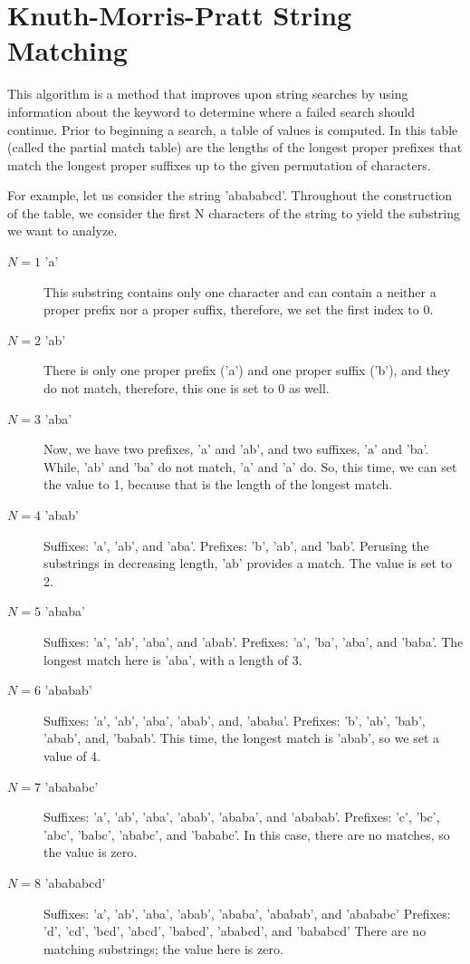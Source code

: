 \section{Knuth-Morris-Pratt String Matching}
This algorithm is a method that improves upon string searches by using information about the keyword to determine where a failed search should continue.
Prior to beginning a search, a table of values is computed.
In this table (called the partial match table) are the lengths of the longest proper prefixes that match the longest proper suffixes up to the given permutation of characters.

For example, let us consider the string 'abababcd'.
Throughout the construction of the table, we consider the first N characters of the string to yield the substring we want to analyze.

\begin{description}
\item[$N = 1$ 'a']
This substring contains only one character and can contain a neither a proper prefix nor a proper suffix, therefore, we set the first index to 0.

\item[$N = 2$ 'ab']
There is only one proper prefix ('a') and one proper suffix ('b'), and they do not match, therefore, this one is set to 0 as well.

\item[$N = 3$ 'aba']
Now, we have two prefixes, 'a' and 'ab', and two suffixes, 'a' and 'ba'.
While, 'ab' and 'ba' do not match, 'a' and 'a' do.
So, this time, we can set the value to 1, because that is the length of the longest match.

\item[$N = 4$ 'abab']
Suffixes: 'a', 'ab', and 'aba'.
Prefixes: 'b', 'ab', and 'bab'.
Perusing the substrings in decreasing length, 'ab' provides a match. The value is set to 2.

\item[$N = 5$ 'ababa']
Suffixes: 'a', 'ab', 'aba', and 'abab'.
Prefixes: 'a', 'ba', 'aba', and 'baba'.
The longest match here is 'aba', with a length of 3.

\item[$N = 6$ 'ababab']
Suffixes: 'a', 'ab', 'aba', 'abab', and, 'ababa'.
Prefixes: 'b', 'ab', 'bab', 'abab', and, 'babab'.
This time, the longest match is 'abab', so we set a value of 4.

\item[$N = 7$ 'abababc']
Suffixes: 'a', 'ab', 'aba', 'abab', 'ababa', and 'ababab'.
Prefixes: 'c', 'bc', 'abc', 'babc', 'ababc', and 'bababc'.
In this case, there are no matches, so the value is zero.

\item[$N = 8$ 'abababcd']
Suffixes: 'a', 'ab', 'aba', 'abab', 'ababa', 'ababab', and 'abababc'
Prefixes: 'd', 'cd', 'bcd', 'abcd', 'babcd', 'ababcd', and 'bababcd'
There are no matching substrings; the value here is zero.
\end{description}

